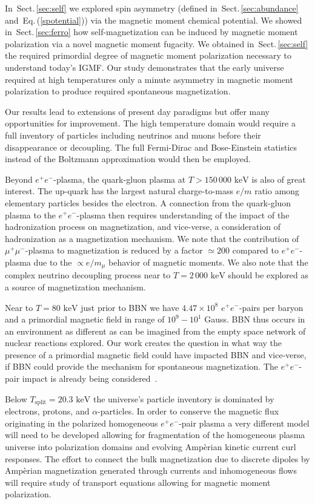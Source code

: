 \documentclass[aps,prd,floatfix,reprint]{revtex4-2}
\newcommand*{\keV}{\text{ keV}}
\newcommand{\req}[1]{Eq.\,(\ref{#1})}
\newcommand{\rsec}[1]{Sect.\,{\ref{#1}}}
\begin{document}
In~\rsec{sec:self} we explored spin asymmetry (defined in~\rsec{sec:abundance} and~\req{spotential}) via the magnetic moment  chemical potential. We showed in~\rsec{sec:ferro} how self-magnetization can be induced by magnetic moment polarization via a novel magnetic moment fugacity. We obtained in~\rsec{sec:self} the required primordial degree of magnetic moment polarization necessary to understand today's IGMF. Our study demonstrates that the early universe required at high temperatures only a minute asymmetry in magnetic moment polarization to produce required spontaneous magnetization.

Our results lead to extensions of present day paradigms but offer many opportunities for improvement. The high temperature domain would require a full inventory of particles including neutrinos and muons before their disappearance or decoupling. The full Fermi-Dirac and Bose-Einstein statistics instead of the Boltzmann approximation would then be employed. 

Beyond $e^{+}e^{-}$-plasma, the quark-gluon plasma at $T>150\,000\keV$ is also of great interest. The up-quark has the largest natural charge-to-mass $e/m$ ratio among elementary particles besides the electron. A connection from the quark-gluon plasma to the $e^{+}e^{-}$-plasma then requires understanding of the impact of the hadronization process on magnetization, and vice-verse, a consideration of hadronization as a magnetization mechanism. We note that the contribution of $\mu^{+}\mu^{-}$-plasma to magnetization is reduced by a factor $\simeq 200$ compared to $e^{+}e^{-}$-plasma due to the $\propto e/m_{\mu}$ behavior of magnetic moments. We also note that the complex neutrino decoupling process near to $T=2\,000\keV$ should be explored as a source of magnetization mechanism.
 
Near to $T=80\keV$ just prior to BBN we have $4.47\times10^{8}$ $e^{+}e^{-}$-pairs per baryon and a primordial magnetic field in range of $10^{9}-10^{1}$ Gauss. BBN thus occurs in an environment as different as can be imagined from the empty space network of nuclear reactions explored. Our work creates the question in what way the presence of a primordial magnetic field could have impacted BBN and vice-verse, if BBN could provide the mechanism for spontaneous magnetization. The $e^{+}e^{-}$-pair impact is already being considered~\cite{Grayson:2023flr}.

Below $T_\mathrm{split}=20.3\keV$ the universe's particle inventory is dominated by electrons, protons, and $\alpha$-particles. In order to conserve the magnetic flux originating in the polarized homogeneous $e^{+}e^{-}$-pair plasma a very different model will need to be developed allowing for fragmentation of the homogeneous plasma universe into polarization domains and evolving Amp{\`e}rian kinetic current curl responses. The effort to connect the bulk magnetization due to discrete dipoles by Amp{\`e}rian magnetization generated through currents and inhomogeneous flows will require study of transport equations allowing for magnetic moment polarization. 
\end{document}
